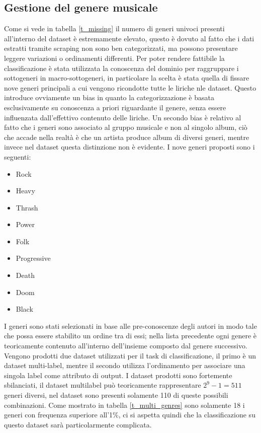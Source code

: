 \documentclass[technote]{IEEEtran}
\begin{document}
\subsection{Gestione del genere musicale}
Come si vede in tabella \ref{t_missing} il numero di generi univoci presenti all'interno del dataset è estremamente elevato, questo è dovuto al fatto che i dati estratti tramite scraping non sono ben categorizzati, ma possono presentare leggere variazioni o ordinamenti differenti. Per poter rendere fattibile la classificazione è stata utilizzata la conoscenza del dominio per raggruppare i sottogeneri in macro-sottogeneri, in particolare la scelta è stata quella di fissare nove generi principali a cui vengono ricondotte tutte le liriche nle dataset. Questo introduce ovviamente un bias in quanto la categorizzazione è basata esclusivamente su conoscenza a priori riguardante il genere, senza essere influenzata dall'effettivo contenuto delle liriche. Un secondo bias è relativo al fatto che i generi sono associato al gruppo musicale e non al singolo album, ciò che accade nella realtà è che un artista produce album di diversi generi, mentre invece nel dataset questa distinzione non è evidente.\newpage
I nove generi proposti sono i seguenti:
\begin{itemize}
\item Rock
\item Heavy
\item Thrash
\item Power
\item Folk
\item Progressive
\item Death
\item Doom
\item Black
\end{itemize}
I generi sono stati selezionati in base alle pre-conoscenze degli autori in modo tale che possa essere stabilito un ordine tra di essi; nella lista precedente ogni genere è teoricamente contenuto all'interno dell'insieme composto dal genere successivo. Vengono prodotti due dataset utilizzati per il task di classificazione, il primo è un dataset multi-label, mentre il secondo utilizza l'ordinamento per associare una singola label come attributo di output. I dataset prodotti sono fortemente sbilanciati, il dataset multilabel può teoricamente rappresentare $ 2^9 - 1 = 511 $ generi diversi, nel dataset sono presenti solamente 110 di queste possibili combinazioni. Come mostrato in tabella \ref{t_multi_genres} sono solamente 18 i generi con frequenza superiore all'1\%, ci si aspetta quindi che la classificazione su questo dataset sarà particolarmente complicata.
\end{document}
